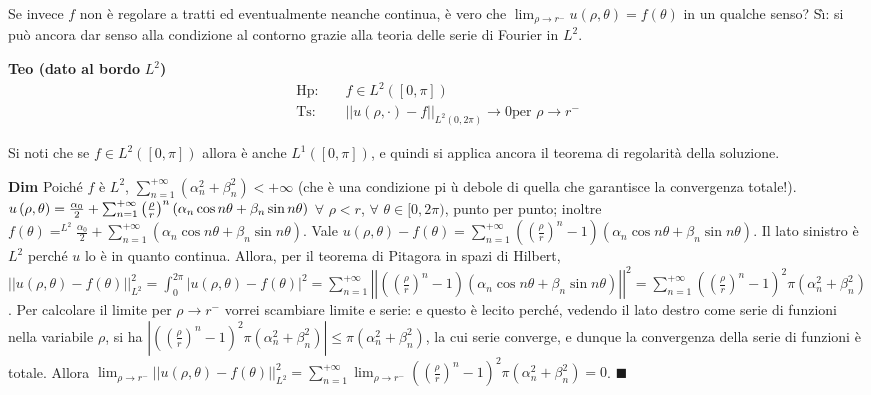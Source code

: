 \documentclass{article}
\begin{document}
Se invece $f$ non \`{e} regolare a tratti ed eventualmente neanche continua, 
\`{e} vero che $\lim_{\rho \rightarrow r^{-}}u\left( \rho ,\theta \right)
=f\left( \theta \right) $ in un qualche senso? S\`{\i}: si pu\`{o} ancora
dar senso alla condizione al contorno grazie alla teoria delle serie di
Fourier in $L^{2}$.

\textbf{Teo (dato al bordo }$L^{2}$\textbf{)}%
\begin{eqnarray*}
\text{Hp}\text{: } &&f\in L^{2}\left( \left[ 0,\pi \right] \right) \\
\text{Ts}\text{: } &&\left\vert \left\vert u\left( \rho ,\cdot \right)
-f\right\vert \right\vert _{L^{2}\left( 0,2\pi \right) }\rightarrow 0\text{
per }\rho \rightarrow r^{-}
\end{eqnarray*}

Si noti che se $f\in L^{2}\left( \left[ 0,\pi \right] \right) $ allora \`{e}
anche $L^{1}\left( \left[ 0,\pi \right] \right) $, e quindi si applica
ancora il teorema di regolarit\`{a} della soluzione.

\textbf{Dim} Poich\'{e} $f$ \`{e} $L^{2}$, $\sum_{n=1}^{+\infty }\left(
\alpha _{n}^{2}+\beta _{n}^{2}\right) <+\infty $ (che \`{e} una condizione pi%
\`{u} debole di quella che garantisce la convergenza totale!). $u\left( \rho
,\theta \right) =\frac{\alpha _{0}}{2}+\sum_{n=1}^{+\infty }\left( \frac{%
\rho }{r}\right) ^{n}\left( \alpha _{n}\cos n\theta +\beta _{n}\sin n\theta
\right) $ $\forall $ $\rho <r$, $\forall $ $\theta \in \lbrack 0,2\pi )$,
punto per punto; inoltre $%
f\left( \theta \right) =^{L^{2}}\frac{\alpha _{0}}{2}+\sum_{n=1}^{+\infty
}\left( \alpha _{n}\cos n\theta +\beta _{n}\sin n\theta \right) $. Vale $%
u\left( \rho ,\theta \right) -f\left( \theta \right) =\sum_{n=1}^{+\infty
}\left( \left( \frac{\rho }{r}\right) ^{n}-1\right) \left( \alpha _{n}\cos
n\theta +\beta _{n}\sin n\theta \right) $. Il lato sinistro \`{e} $L^{2}$
perch\'{e} $u$ lo \`{e} in quanto continua. Allora, per il teorema di
Pitagora in spazi di Hilbert, $\left\vert \left\vert u\left( \rho ,\theta
\right) -f\left( \theta \right) \right\vert \right\vert
_{L^{2}}^{2}=\int_{0}^{2\pi }\left\vert u\left( \rho ,\theta \right)
-f\left( \theta \right) \right\vert ^{2}=\sum_{n=1}^{+\infty }\left\vert
\left\vert \left( \left( \frac{\rho }{r}\right) ^{n}-1\right) \left( \alpha
_{n}\cos n\theta +\beta _{n}\sin n\theta \right) \right\vert \right\vert
^{2}=\sum_{n=1}^{+\infty }\left( \left( \frac{\rho }{r}\right) ^{n}-1\right)
^{2}\pi \left( \alpha _{n}^{2}+\beta _{n}^{2}\right) $. Per calcolare il
limite per $\rho \rightarrow r^{-}$ vorrei scambiare limite e serie: e
questo \`{e} lecito perch\'{e}, vedendo il lato destro come serie di
funzioni nella variabile $\rho $, si ha $\left\vert \left( \left( \frac{\rho 
}{r}\right) ^{n}-1\right) ^{2}\pi \left( \alpha _{n}^{2}+\beta
_{n}^{2}\right) \right\vert \leq \pi \left( \alpha _{n}^{2}+\beta
_{n}^{2}\right) $, la cui serie converge, e dunque la convergenza della
serie di funzioni \`{e} totale. Allora $\lim_{\rho \rightarrow
r^{-}}\left\vert \left\vert u\left( \rho ,\theta \right) -f\left( \theta
\right) \right\vert \right\vert _{L^{2}}^{2}=\sum_{n=1}^{+\infty }\lim_{\rho
\rightarrow r^{-}}\left( \left( \frac{\rho }{r}\right) ^{n}-1\right) ^{2}\pi
\left( \alpha _{n}^{2}+\beta _{n}^{2}\right) =0$. $\blacksquare $
\end{document}
